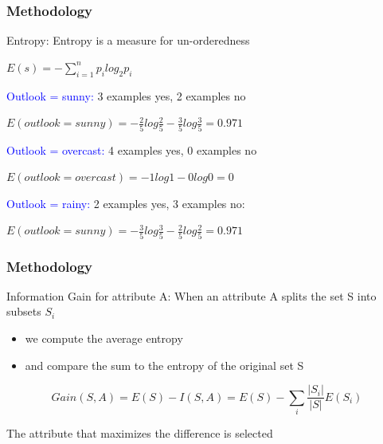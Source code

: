 \documentclass[xcolor={x11names,svgnames,dvipsnames}]{beamer}
\begin{document}
\begin{frame}
\frametitle{Methodology}
\begin{block}{Entropy:}
Entropy is a measure for un-orderedness\\
\begin{center}
$E(s)=-\sum_{i=1}^n p_i log_2p_i$
\end{center}
\textcolor{blue}{Outlook = sunny:} 3 examples yes, 2 examples no\\
\begin{center}
$E(outlook=sunny)=-\frac{2}{5}log{\frac{2}{5}}-\frac{3}{5}log{\frac{3}{5}}=0.971$
\end{center}

\textcolor{blue}{Outlook = overcast:}  4 examples yes, 0 examples no\\

\begin{center}
$E(outlook=overcast)=-1log{1}-0log{0}=0$
\end{center}
\textcolor{blue}{Outlook = rainy:} 2 examples yes, 3 examples no:\\
\begin{center}
$E(outlook=sunny)=-\frac{3}{5}log{\frac{3}{5}}-\frac{2}{5}log{\frac{2}{5}}=0.971$
\end{center}
\end{block}

\end{frame}

\begin{frame}
\frametitle{Methodology}
\begin{block}{Information Gain for attribute A:}
When an attribute A splits the set S into subsets $S_i$
\begin{itemize}
\item  we compute the average entropy
\item  and compare the sum to the entropy of the original set S
\end{itemize}
\begin{equation*}
Gain(S,A)=E(S)-I(S,A)=E(S)-\sum_{i}\frac{|S_i|}{|S|}E(S_i)
\end{equation*}

The attribute that maximizes the difference is selected
\end{block}

\end{frame}
\end{document}
